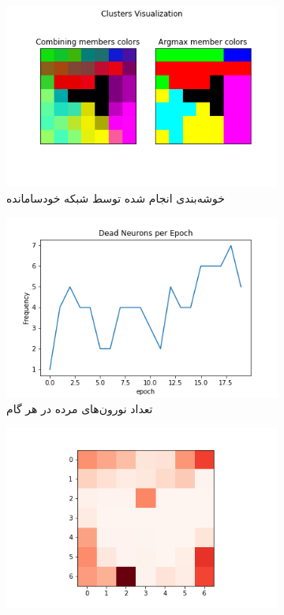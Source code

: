 \documentclass[12pt, a4paper]{article}
\begin{document}
\clearpage

\begin{figure}[h]
    \begin{subfigure}{\linewidth}
        \centering
        \includegraphics[width=0.8\linewidth]{images/q5/r7/cluster.png}
        \caption{خوشه‌بندی انجام شده توسط شبکه خودسامانده}
    \end{subfigure}
    \newline
    \begin{subfigure}{0.45\linewidth}
        \includegraphics[width=\linewidth]{images/q5/r7/dead.png}
        \caption{تعداد نورون‌های مرده در هر گام}
    \end{subfigure}
    \hfill
    \begin{subfigure}{0.45\linewidth}
        \includegraphics[width=\linewidth]{images/q5/r7/umatrix.png}

\end{subfigure}
\end{figure}
\end{document}
